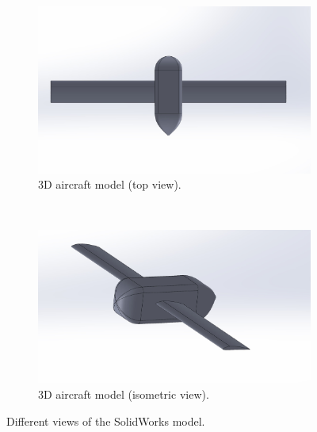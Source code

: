 \begin{figure}[htpb]
\begin{subfigure}{0.5\textwidth}
        \centering
        \includegraphics[width=\textwidth]{Figures/TopView9_29.jpg}
        \caption{3D aircraft model (top view).}
        \label{fig:3d_top}
    \end{subfigure}\\
    \begin{subfigure}{0.5\textwidth}
        \centering
        \includegraphics[width=\textwidth]{Figures/IsoView9_29.jpg}
        \caption{3D aircraft model (isometric view).}
        \label{fig:3d_isometric}
    \end{subfigure}
    \caption[3D model of the aircraft]{Different views of the SolidWorks model.}
    \label{fig:3d_model}
\end{figure}
